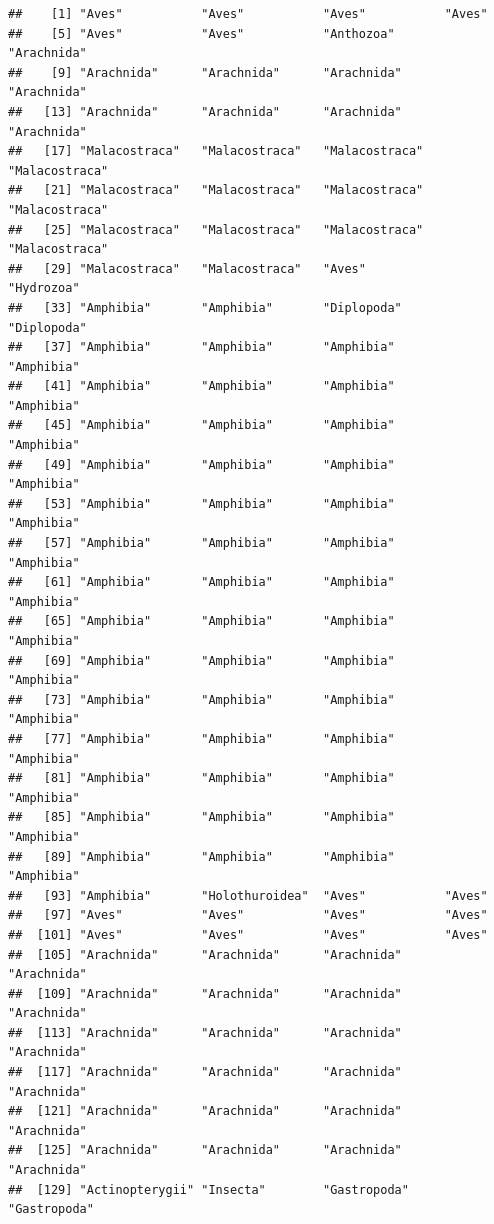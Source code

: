 \documentclass[
]{article}
\begin{document}
\begin{verbatim}
##    [1] "Aves"           "Aves"           "Aves"           "Aves"          
##    [5] "Aves"           "Aves"           "Anthozoa"       "Arachnida"     
##    [9] "Arachnida"      "Arachnida"      "Arachnida"      "Arachnida"     
##   [13] "Arachnida"      "Arachnida"      "Arachnida"      "Arachnida"     
##   [17] "Malacostraca"   "Malacostraca"   "Malacostraca"   "Malacostraca"  
##   [21] "Malacostraca"   "Malacostraca"   "Malacostraca"   "Malacostraca"  
##   [25] "Malacostraca"   "Malacostraca"   "Malacostraca"   "Malacostraca"  
##   [29] "Malacostraca"   "Malacostraca"   "Aves"           "Hydrozoa"      
##   [33] "Amphibia"       "Amphibia"       "Diplopoda"      "Diplopoda"     
##   [37] "Amphibia"       "Amphibia"       "Amphibia"       "Amphibia"      
##   [41] "Amphibia"       "Amphibia"       "Amphibia"       "Amphibia"      
##   [45] "Amphibia"       "Amphibia"       "Amphibia"       "Amphibia"      
##   [49] "Amphibia"       "Amphibia"       "Amphibia"       "Amphibia"      
##   [53] "Amphibia"       "Amphibia"       "Amphibia"       "Amphibia"      
##   [57] "Amphibia"       "Amphibia"       "Amphibia"       "Amphibia"      
##   [61] "Amphibia"       "Amphibia"       "Amphibia"       "Amphibia"      
##   [65] "Amphibia"       "Amphibia"       "Amphibia"       "Amphibia"      
##   [69] "Amphibia"       "Amphibia"       "Amphibia"       "Amphibia"      
##   [73] "Amphibia"       "Amphibia"       "Amphibia"       "Amphibia"      
##   [77] "Amphibia"       "Amphibia"       "Amphibia"       "Amphibia"      
##   [81] "Amphibia"       "Amphibia"       "Amphibia"       "Amphibia"      
##   [85] "Amphibia"       "Amphibia"       "Amphibia"       "Amphibia"      
##   [89] "Amphibia"       "Amphibia"       "Amphibia"       "Amphibia"      
##   [93] "Amphibia"       "Holothuroidea"  "Aves"           "Aves"          
##   [97] "Aves"           "Aves"           "Aves"           "Aves"          
##  [101] "Aves"           "Aves"           "Aves"           "Aves"          
##  [105] "Arachnida"      "Arachnida"      "Arachnida"      "Arachnida"     
##  [109] "Arachnida"      "Arachnida"      "Arachnida"      "Arachnida"     
##  [113] "Arachnida"      "Arachnida"      "Arachnida"      "Arachnida"     
##  [117] "Arachnida"      "Arachnida"      "Arachnida"      "Arachnida"     
##  [121] "Arachnida"      "Arachnida"      "Arachnida"      "Arachnida"     
##  [125] "Arachnida"      "Arachnida"      "Arachnida"      "Arachnida"     
##  [129] "Actinopterygii" "Insecta"        "Gastropoda"     "Gastropoda"    

\end{verbatim}
\end{document}
